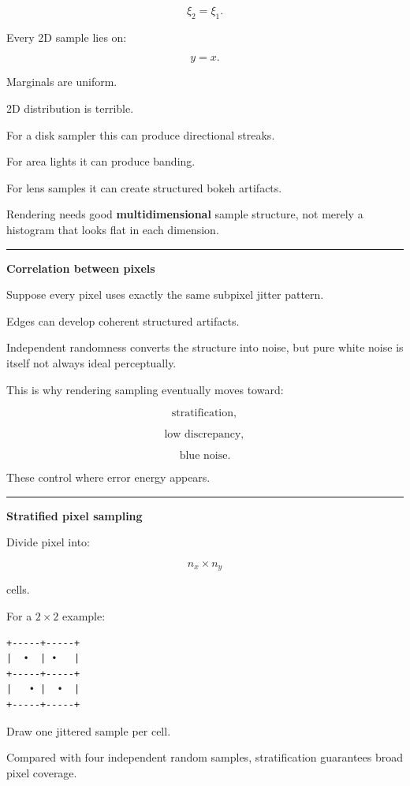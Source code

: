 \[
\xi_2=\xi_1.
\]

Every 2D sample lies on:

\[
y=x.
\]

Marginals are uniform.

2D distribution is terrible.

For a disk sampler this can produce directional streaks.

For area lights it can produce banding.

For lens samples it can create structured bokeh artifacts.

Rendering needs good \textbf{multidimensional} sample structure, not merely a histogram that looks flat in each dimension.

\begin{center}\rule{0.5\linewidth}{0.5pt}\end{center}

\textbf{Correlation between pixels}

Suppose every pixel uses exactly the same subpixel jitter pattern.

Edges can develop coherent structured artifacts.

Independent randomness converts the structure into noise, but pure white noise is itself not always ideal perceptually.

This is why rendering sampling eventually moves toward:

\[
\text{stratification},
\]

\[
\text{low discrepancy},
\]

\[
\text{blue noise}.
\]

These control where error energy appears.

\begin{center}\rule{0.5\linewidth}{0.5pt}\end{center}

\textbf{Stratified pixel sampling}

Divide pixel into:

\[
n_x\times n_y
\]

cells.

For a \(2\times2\) example:

\begin{verbatim}
+-----+-----+
|  •  | •   |
+-----+-----+
|   • |  •  |
+-----+-----+
\end{verbatim}

Draw one jittered sample per cell.

Compared with four independent random samples, stratification guarantees broad pixel coverage.

